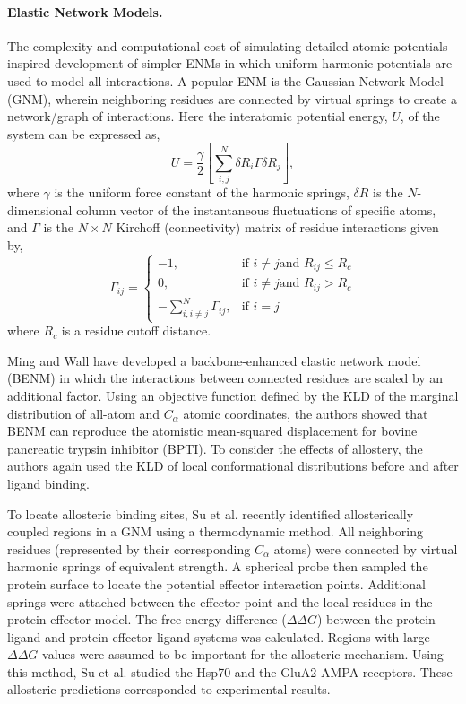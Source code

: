 \paragraph{Elastic Network Models.} The complexity and computational cost of simulating detailed atomic potentials inspired development of simpler ENMs in which uniform harmonic potentials are used to model all interactions.\cite{Tirion1996a,Bahar1997a,Haliloglu1997a} A popular ENM is the Gaussian Network Model (GNM), wherein neighboring residues are connected by virtual springs to create a network/graph of interactions. Here the interatomic potential energy, $U$, of the system can be expressed as,
\begin{equation}
    U = \frac{\gamma}{2}\left[\sum_{i,j}^{N}\delta R_i\Gamma\delta R_j\right],
\end{equation}
where $\gamma$ is the uniform force constant of the harmonic springs, ${\delta R}$ is the $N$-dimensional column vector of the instantaneous fluctuations of specific atoms, and $\Gamma$ is the $N\times N$ Kirchoff (connectivity) matrix of residue interactions given by,
\begin{equation}
    \Gamma_{ij} = \begin{cases}
        -1, & \text{if } i \neq j \text{and } R_{ij} \leq R_c\\
        0, & \text{if } i \neq j \text{and } R_{ij} > R_c\\
        -\sum_{i,i\neq j}^N \Gamma_{ij}, & \text{if } i = j
    \end{cases}
\end{equation}
where $R_c$ is a residue cutoff distance.
\par Ming and Wall have developed a backbone-enhanced elastic network model (BENM) in which the interactions between connected residues are scaled by an additional factor. Using an objective function defined by the KLD of the marginal distribution of all-atom and $C_{\alpha}$ atomic coordinates, the authors showed that BENM can reproduce the atomistic mean-squared displacement for bovine pancreatic trypsin inhibitor (BPTI).\cite{Ming2005a} To consider the effects of allostery, the authors again used the KLD of local conformational distributions before and after ligand binding.\cite{Ming2005a}
\par To locate allosteric binding sites, Su et al. recently identified allosterically coupled regions in a GNM using a thermodynamic method.\cite{Su2014c} All neighboring residues (represented by their corresponding $C_{\alpha}$ atoms) were connected by virtual harmonic springs of equivalent strength. A spherical probe then sampled the protein surface to locate the potential effector interaction points. Additional springs were attached between the effector point and the local residues in the protein-effector model. The free-energy difference ($\Delta\Delta G$) between the protein-ligand and protein-effector-ligand systems was calculated. Regions with large $\Delta\Delta G$ values were assumed to be important for the allosteric mechanism. Using this method, Su et al. studied the Hsp70 and the GluA2 AMPA receptors. These allosteric predictions corresponded to experimental results.\cite{Su2014c}
